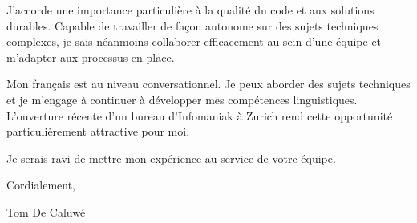 \documentclass[12pt,a4paper]{letter}
\begin{document}
J'accorde une importance particulière à la qualité du code et aux solutions durables. Capable de travailler de façon autonome sur des sujets techniques complexes, je sais néanmoins collaborer efficacement au sein d'une équipe et m'adapter aux processus en place.

Mon français est au niveau conversationnel. Je peux aborder des sujets techniques et je m'engage à continuer à développer mes compétences linguistiques. L'ouverture récente d'un bureau d'Infomaniak à Zurich rend cette opportunité particulièrement attractive pour moi.

Je serais ravi de mettre mon expérience au service de votre équipe.

Cordialement,

Tom De Caluwé


\end{document}
